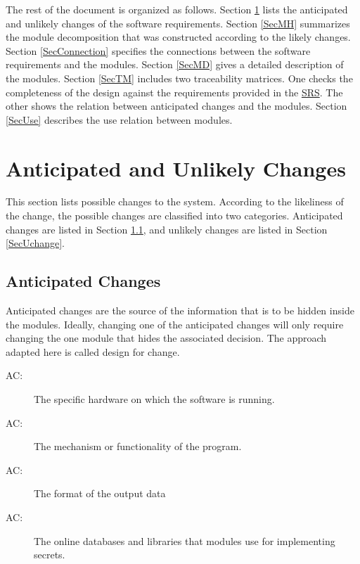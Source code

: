 \documentclass[12pt, titlepage]{article}
\newcounter{acnum}
\newcommand{\actheacnum}{AC\theacnum}
\begin{document}
The rest of the document is organized as follows. Section
\ref{SecChange} lists the anticipated and unlikely changes of the software
requirements. Section \ref{SecMH} summarizes the module decomposition that
was constructed according to the likely changes. Section \ref{SecConnection}
specifies the connections between the software requirements and the
modules. Section \ref{SecMD} gives a detailed description of the
modules. Section \ref{SecTM} includes two traceability matrices. One checks
the completeness of the design against the requirements provided in the \href{https://github.com/NicLobo/Capstone-yoGERT/blob/main/docs/SRS/SRS.pdf}{SRS}. The
other shows the relation between anticipated changes and the modules. Section
\ref{SecUse} describes the use relation between modules.

\section{Anticipated and Unlikely Changes} \label{SecChange}

This section lists possible changes to the system. According to the likeliness
of the change, the possible changes are classified into two
categories. Anticipated changes are listed in Section \ref{SecAchange}, and
unlikely changes are listed in Section \ref{SecUchange}.

\subsection{Anticipated Changes} \label{SecAchange}

Anticipated changes are the source of the information that is to be hidden
inside the modules. Ideally, changing one of the anticipated changes will only
require changing the one module that hides the associated decision. The approach
adapted here is called design for
change.

\begin{description}
\item[ \actheacnum \label{acHardware}:] The specific
  hardware on which the software is running.
\item[ \actheacnum \label{acMechFunc}:] The mechanism or 
  functionality of the program.
\item[ \actheacnum \label{acOutput}:] The format of
  the output data
\item[ \actheacnum \label{acOnlineLibraries}:] The online databases and libraries that modules use for implementing secrets. 
\end{description}
\end{document}
